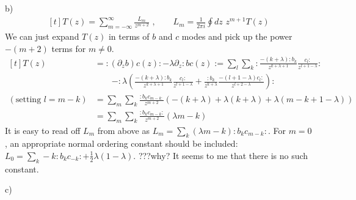 \documentclass[12pt]{article}
\begin{document}
\begin{paragraph}{b)}
\begin{equation}
\begin{aligned}[t]
T(z)=\sum\limits_{m=-\infty}^{\infty}\frac{L_m}{z^{m+2}}\,\, ,\qquad L_m=\frac{1}{2\pi i}\oint dz \,\, z^{m+1}T(z)
\end{aligned}
\end{equation}
We can just expand $T(z)$ in terms of $b$ and $c$ modes and pick up the power $-(m+2)$ terms for $m\neq 0$.
\begin{equation}
\begin{aligned}[t]
T(z)&= : (\partial_z b) c(z): - \lambda \partial_z : b c (z):=\sum\limits_l\sum\limits_k :\frac{-(k+\lambda):b_k}{z^{k+\lambda+1}}\frac{c_l:}{z^{l+1-\lambda}}:\\
&\qquad-:\lambda(\frac{-(k+\lambda):b_k}{z^{k+\lambda+1}}\frac{c_l:}{z^{l+1-\lambda}}+\frac{:b_k}{z^{k+\lambda}}\frac{-(l+1-\lambda)c_l:}{z^{l+2-\lambda}}):\\
(\text{setting  }l=m-k)&=\sum\limits_{m}\sum\limits_{k}\frac{:b_k c_{m-k:}}{z^{m+2}}(-(k+\lambda)+\lambda(k+\lambda)+\lambda(m-k+1-\lambda))\\
&=\sum\limits_{m}\sum\limits_{k}\frac{:b_k c_{m-k}:}{z^{m+2}}(\lambda  m-k)
\end{aligned}
\end{equation}
It is easy to read off $L_m$ from above as $L_m=\sum\limits_{k}(\lambda  m-k):b_k c_{m-k}:$. For $m=0$, an appropriate normal ordering constant should be included: $L_0=\sum\limits_{k}  -k:b_k c_{-k}:+\frac{1}{2}\lambda(1-\lambda)$. ???why? It seems to me that there is no such constant.
\end{paragraph}
\begin{paragraph}{c)}

\end{paragraph}
\end{document}

